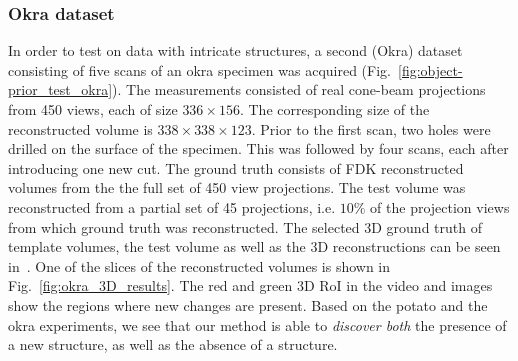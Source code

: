 \documentclass[journal]{IEEEtran}
\begin{document}
\subsubsection{\textbf{Okra dataset}}
\label{Sec:okra}
In order to test on data with intricate structures, a second (Okra) dataset consisting of five scans of an okra specimen was acquired (Fig.~\ref{fig:object-prior_test_okra}). The measurements consisted of real cone-beam projections from 450 views, each of size $336\times156$. The corresponding size of the reconstructed volume is $338\times338\times123$. Prior to the first scan, two holes were drilled on the surface of the specimen. This was followed by four scans, each after introducing one new cut. The ground truth consists of FDK reconstructed volumes from the the full set of 450 view projections. The test volume was reconstructed from a partial set of 45 projections, i.e. $10\%$ of the projection views from which ground truth was reconstructed. The selected 3D ground truth of template volumes, the test volume as well as the 3D reconstructions can be seen in~\cite{supp_paper}. One of the slices of the reconstructed volumes is shown in Fig.~\ref{fig:okra_3D_results}. The red and green 3D RoI in the video and images show the regions where new changes are present. Based on the potato and the okra experiments, we see that our method is able to \emph{discover both} the presence of a new structure, as well as the absence of a structure.
\end{document}
